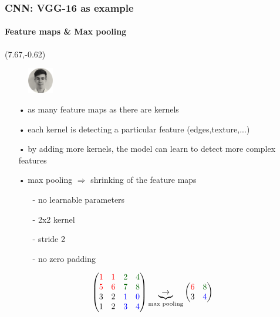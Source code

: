 \begin{frame}
\frametitle{CNN: VGG-16 as example}
\framesubtitle{Feature maps \& Max pooling} 

\begin{textblock}{15}(7.67,-0.62)
	\begin{figure}[H]
		\includegraphics[width=0.1\textwidth]{Images/Team/DamienTOOMEY.png} 
	\end{figure}
\end{textblock}

\begin{itemize}
\item[•] as many feature maps as there are kernels
\item[•] each kernel is detecting a particular feature (edges,texture,...)
\item[•] by adding more kernels, the model can learn to detect more complex features
\item[•] max pooling $ \Rightarrow $ shrinking of the feature maps 
\begin{itemize}
\item[-] no learnable parameters
\item[-] 2x2 kernel
\item[-] stride 2
\item[-] no zero padding
\end{itemize}
\end{itemize}

\[
\begin{pmatrix}
\textcolor{red}{1} & \textcolor{red}{1} & \textcolor{green}{2} & \textcolor{green}{4} \\
\textcolor{red}{5} & \textcolor{red}{6} & \textcolor{green}{7} & \textcolor{green}{8} \\
3 & 2 & \textcolor{blue}{1} & \textcolor{blue}{0} \\
1 & 2 & \textcolor{blue}{3} & \textcolor{blue}{4} \\
\end{pmatrix}
\underbrace{\rightarrow}_{\text{max pooling}}
\begin{pmatrix}
\textcolor{red}{6} & \textcolor{green}{8} \\
3 & \textcolor{blue}{4} \\
\end{pmatrix}
\]

\end{frame}

